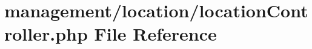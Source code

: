 \hypertarget{location_controller_8php}{}\section{management/location/location\+Controller.php File Reference}
\label{location_controller_8php}
